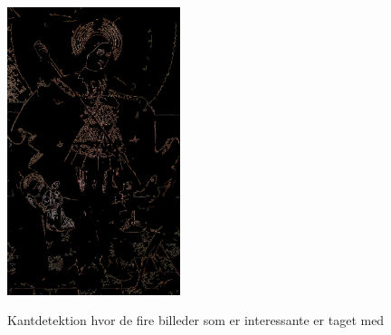 \begin{figure}[!h]
{        \includegraphics[angle=0,width=0.45\textwidth]{afsnit/afprovning/billeder/thressholds/krafitige_farver/krafite_detalier/2_iteration/300-800.png}
        \label{300-800}}\hspace{1em}
        \caption[]{Kantdetektion hvor de fire billeder som er interessante er taget med}
     \label{allesammen3}
\end{figure}
 
